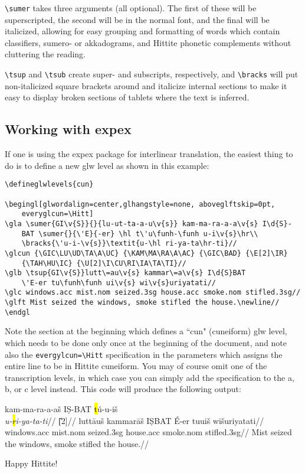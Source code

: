 \documentclass[12pt,A4]{article}
\begin{document}
\verb|\sumer| takes three arguments (all optional). The first of these will be superscripted, the second will be in the normal font, and the final will be italicized, allowing for easy grouping and formatting of words which contain classifiers, sumero- or akkadograms, and Hittite phonetic complements without cluttering the reading.

\verb|\tsup| and \verb|\tsub| create super- and subscripts, respectively, and \verb|\bracks| will put non-italicized square brackets around and italicize internal sections to make it easy to display broken sections of tablets where the text is inferred.

\subsection{Working with expex}

If one is using the expex package for interlinear translation, the easiest thing to do is to define a new glw level as shown in this example:
\begin{verbatim}
\defineglwlevels{cun}

\begingl[glwordalign=center,glhangstyle=none, aboveglftskip=0pt, 
    everyglcun=\Hitt]
\gla \sumer{GI\v{S}}{}{lu-ut-ta-a-u\v{s}} kam-ma-ra-a-a\v{s} I\d{S}-
    BAT \sumer{}{\'E}{-er} \hl t\'u\funh-\funh u-i\v{s}\hr\\ 
    \bracks{\'u-i-\v{s}}\textit{u-\hl ri-ya-ta\hr-ti}//
\glcun {\GIC\LU\UD\TA\A\UC} {\KAM\MA\RA\A\AC} {\GIC\BAD} {\E[2]\IR} 
    {\TAH\HU\IC} {\U[2]\I\CU\RI\IA\TA\TI}//
\glb \tsup{GI\v{S}}lutt\=au\v{s} kammar\=a\v{s} I\d{S}BAT 
    \'E-er tu\funh\funh ui\v{s} wi\v{s}uriyatati//
\glc windows.acc mist.nom seized.3sg house.acc smoke.nom stifled.3sg//
\glft Mist seized the windows, smoke stifled the house.\newline//
\endgl
\end{verbatim}

Note the section at the beginning which defines a ``cun" (cuneiform) glw level, which needs to be done only once at the beginning of the document, and note also the \verb|evergylcun=\Hitt| specification in the parameters which assigns the entire line to be in Hittite cuneiform. You may of course omit one of the transcription levels, in which case you can simply add the specification to the a, b, or c level instead. This code will produce the following output:\\


    \begingl[glwordalign=center,glhangstyle=none, aboveglftskip=0pt, everyglcun=\Hitt]
    \gla {} kam-ma-ra-a-a\v{s} I\d{S}-BAT  \hl t\'u\funh-\funh u-i\v{s}\hr\\ \textit{u-\hl ri-ya-ta\hr-ti}//
    \glcun {\GIC\LU\UD\TA\A\UC} {\KAM\MA\RA\A\AC} {\GIC\BAD} {\E[2]\IR} {\TAH\HU\IC} {\U[2]\I\CU\RI\IA\TA\TI}//
    \glb {}lutt\=au\v{s} kammar\=a\v{s} I\d{S}BAT \'E-er tu\funh\funh ui\v{s} wi\v{s}uriyatati//
    \glc windows.acc mist.nom seized.3sg house.acc smoke.nom stifled.3sg//
    \glft Mist seized the windows, smoke stifled the house.\newline//
    \endgl

Happy Hittite!
\end{document}
